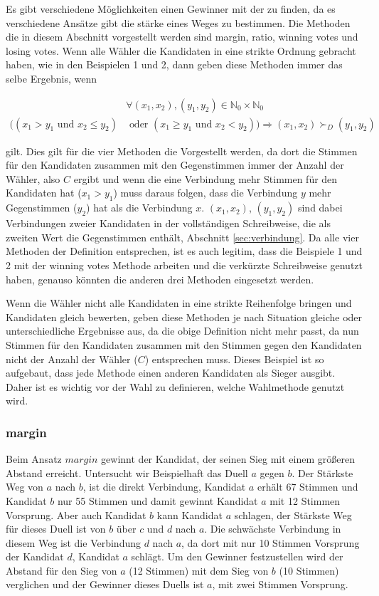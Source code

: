 Es gibt verschiedene Möglichkeiten einen Gewinner mit der \schulze zu finden, da es verschiedene  Ansätze gibt die stärke eines Weges zu bestimmen. Die Methoden die in diesem Abschnitt vorgestellt werden sind margin, ratio, winning votes und losing votes.  Wenn alle Wähler die Kandidaten in eine strikte Ordnung gebracht haben, wie in den Beispielen 1 und 2, dann geben diese Methoden immer das selbe Ergebnis, wenn

\begin{align*}
& \forall (x_{1},x_{2}),(y_{1},y_{2}) \in \mathbb{N}_0 	\times \mathbb{N}_0 \\
((x_{1} > y_{1} \textrm{ und }  x_{2}\leq y_{2}) & \textrm{ oder } (x_{1} \geq y_{1} \textrm{ und } x_{2} < y_{2}))\Rightarrow (x_{1},x_{2}) \succ_{D} (y_{1},y_{2})
\end{align*}

gilt. Dies gilt für die vier Methoden die Vorgestellt werden, da dort die Stimmen für den Kandidaten zusammen mit den Gegenstimmen immer der Anzahl der Wähler, also $C$ ergibt und wenn die eine Verbindung mehr Stimmen für den Kandidaten hat ($x_{1} > y_{1}$) muss daraus folgen, dass die Verbindung $y$ mehr Gegenstimmen ($y_{2}$) hat als die Verbindung $x$. $(x_{1},x_{2})$, $(y_{1},y_{2})$ sind dabei Verbindungen zweier Kandidaten in der vollständigen Schreibweise, die als zweiten Wert die Gegenstimmen enthält, Abschnitt \ref{sec:verbindung}. Da alle vier Methoden der Definition entsprechen, ist es auch legitim, dass die Beispiele 1 und 2 mit der winning votes Methode arbeiten und die verkürzte Schreibweise genutzt haben, genauso könnten die anderen drei Methoden eingesetzt werden.

Wenn die Wähler nicht alle Kandidaten in eine strikte Reihenfolge bringen und Kandidaten gleich bewerten, geben diese Methoden je nach Situation gleiche oder unterschiedliche Ergebnisse aus, da die obige Definition nicht mehr passt, da nun Stimmen für den Kandidaten zusammen mit den Stimmen gegen den Kandidaten nicht der Anzahl der Wähler ($C$) entsprechen muss.
Dieses Beispiel ist so aufgebaut, dass jede Methode einen anderen Kandidaten als Sieger ausgibt. Daher ist es wichtig vor der Wahl zu definieren, welche Wahlmethode genutzt wird.

\subsubsection{margin}
\label{sec:margin}
Beim Ansatz $margin$ gewinnt der Kandidat, der seinen Sieg mit einem größeren Abstand erreicht. 
Untersucht wir Beispielhaft das Duell $a$ gegen $b$. Der Stärkste Weg von $a$ nach $b$, ist die direkt Verbindung, Kandidat $a$ erhält 67 Stimmen und Kandidat $b$ nur 55 Stimmen und damit gewinnt Kandidat $a$ mit 12 Stimmen Vorsprung. 
Aber auch Kandidat $b$ kann Kandidat $a$ schlagen, der Stärkste Weg für dieses Duell ist von $b$ über $c$ und $d$ nach $a$. Die schwächste Verbindung in diesem Weg ist die Verbindung $d$ nach $a$, da dort mit nur 10 Stimmen Vorsprung der Kandidat $d$, Kandidat $a$ schlägt.
Um den Gewinner festzustellen wird der Abstand für den Sieg von $a$ (12 Stimmen) mit dem Sieg von $b$ (10 Stimmen) verglichen und der Gewinner dieses Duells ist $a$, mit zwei Stimmen Vorsprung.

